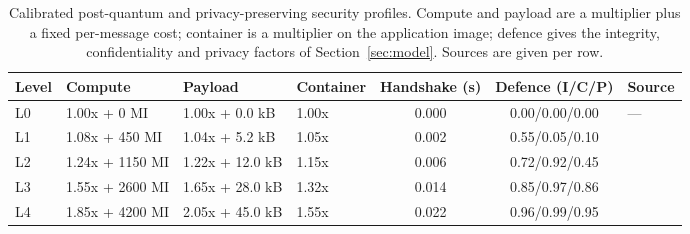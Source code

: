 \begin{table}[t]
\centering
\footnotesize
\caption{Calibrated post-quantum and privacy-preserving security profiles.
Compute and payload are a multiplier plus a fixed per-message cost; container is
a multiplier on the application image; defence gives the integrity,
confidentiality and privacy factors of Section~\ref{sec:model}. Sources are
given per row.}
\label{tab:p4-crypto}
\setlength{\tabcolsep}{5pt}
\begin{tabular}{@{}l l l l c c l@{}}
\toprule
Level & Compute & Payload & Container & Handshake (s) & Defence (I/C/P) & Source\\
\midrule
L0 & 1.00x + 0 MI & 1.00x + 0.0 kB & 1.00x & 0.000 & 0.00/0.00/0.00 & ---\\
L1 & 1.08x + 450 MI & 1.04x + 5.2 kB & 1.05x & 0.002 & 0.55/0.05/0.10 & \cite{fips204,wang2026craft}\\
L2 & 1.24x + 1150 MI & 1.22x + 12.0 kB & 1.15x & 0.006 & 0.72/0.92/0.45 & \cite{fips203,fips204,sammartino2026qfe}\\
L3 & 1.55x + 2600 MI & 1.65x + 28.0 kB & 1.32x & 0.014 & 0.85/0.97/0.86 & \cite{cheon2017ckks,wang2026craft}\\
L4 & 1.85x + 4200 MI & 2.05x + 45.0 kB & 1.55x & 0.022 & 0.96/0.99/0.95 & \cite{bonawitz2017secagg,sammartino2026qfe}\\
\bottomrule
\end{tabular}
\par{}
\end{table}
